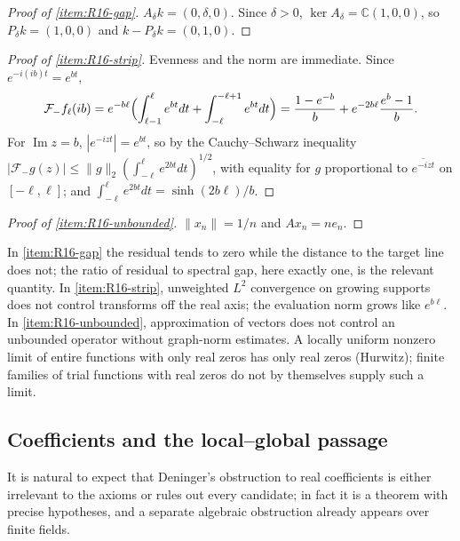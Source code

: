 \documentclass[11pt]{amsart}
\theoremstyle{plain}
\theoremstyle{definition}
\theoremstyle{remark}
\numberwithin{equation}{section}
\newcommand{\C}{\mathbb{C}}
\DeclareMathOperator{\Ima}{Im}
\renewcommand{\Im}{\Ima}
\begin{document}
\begin{proof}[Proof of \ref{item:R16-gap}]
$A_\delta k=(0,\delta,0)$. Since $\delta>0$, $\ker A_\delta=\C(1,0,0)$,
so $P_\delta k=(1,0,0)$ and $k-P_\delta k=(0,1,0)$.
\end{proof}

\begin{proof}[Proof of \ref{item:R16-strip}]
Evenness and the norm are immediate. Since $e^{-i(ib)t}=e^{bt}$,
\[
\mathcal F_-f_\ell(ib)=e^{-b\ell}\Bigl(\int_{\ell-1}^{\ell}e^{bt}dt
+\int_{-\ell}^{-\ell+1}e^{bt}dt\Bigr)
=\frac{1-e^{-b}}b+e^{-2b\ell}\frac{e^{b}-1}b.
\]
For $\Im z=b$, $|e^{-izt}|=e^{bt}$, so by the Cauchy--Schwarz inequality
$|\mathcal F_-g(z)|\le\|g\|_2(\int_{-\ell}^{\ell}e^{2bt}dt)^{1/2}$, with
equality for $g$ proportional to $\overline{e^{-izt}}$ on $[-\ell,\ell]$;
and $\int_{-\ell}^{\ell}e^{2bt}dt=\sinh(2b\ell)/b$.
\end{proof}

\begin{proof}[Proof of \ref{item:R16-unbounded}]
$\|x_n\|=1/n$ and $Ax_n=ne_n$.
\end{proof}

In \ref{item:R16-gap} the residual tends to zero while the distance to
the target line does not; the ratio of residual to spectral gap, here
exactly one, is the relevant quantity. In \ref{item:R16-strip},
unweighted $L^2$ convergence on growing supports does not control
transforms off the real axis; the evaluation norm grows like
$e^{b\ell}$. In \ref{item:R16-unbounded}, approximation of vectors does
not control an unbounded operator without graph-norm estimates. A
locally uniform nonzero limit of entire functions with only real zeros
has only real zeros (Hurwitz); finite families of trial functions with
real zeros do not by themselves supply such a limit.

\subsection{Coefficients and the local--global passage}
\label{subsec:neg-coefficients}

It is natural to expect that Deninger's obstruction to real coefficients
is either irrelevant to the axioms or rules out every candidate; in fact
it is a theorem with precise hypotheses, and a separate algebraic
obstruction already appears over finite fields.
\end{document}
